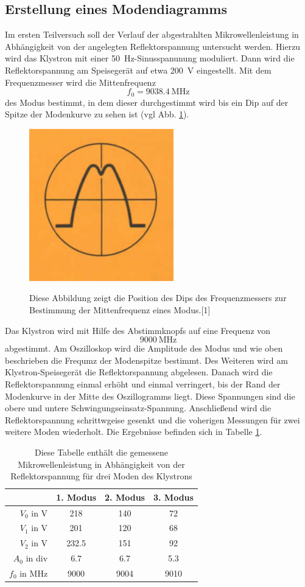 \documentclass[a4paper]{article}
\begin{document}
\subsection{Erstellung eines Modendiagramms}
Im ersten Teilversuch soll der Verlauf der abgestrahlten Mikrowellenleistung in Abhängigkeit von der angelegten Reflektorspannung untersucht werden.
Hierzu wird das Klystron mit einer \SI{50}{\hertz}-Sinusspanunung moduliert.
Dann wird die Reflektorspannung am Speisegerät auf etwa \SI{200}{\volt} eingestellt.
Mit dem Frequenzmesser wird die Mittenfrequenz 
\[
f_0 = \SI{9038,4}{\mega\hertz}
\]
des Modus bestimmt, in dem dieser durchgestimmt wird bis ein Dip auf der Spitze der Modenkurve zu sehen ist (vgl Abb. \ref{dip}).
\begin{figure}[h]
\centering
\includegraphics[scale=0.7]{mode_dip.png}
\label{dip}
\caption{Diese Abbildung zeigt die Position des Dips des Frequenzmessers zur Bestimmung der Mittenfrequenz eines Modus.[1]}
\end{figure}
Das Klystron wird mit Hilfe des Abstimmknopfs auf eine Frequenz von
\[
\SI{9000}{\mega\hertz} 
\]
abgestimmt. Am Oszilloskop wird die Amplitude des Modus und wie oben beschrieben die Frequmz der Modenspitze bestimmt.
Des Weiteren wird am Klystron-Speisegerät die Reflektorspannung abgelesen. Danach wird die Reflektorspannung einmal erhöht und einmal verringert, 
bis der Rand der Modenkurve in der Mitte des Oszillogramms liegt. 
Diese Spannungen sind die obere und untere Schwingungseinsatz-Spannung.
Anschließend wird die Reflektorspannung schrittwgeise gesenkt und die voherigen Messungen für zwei weitere Moden wiederholt.
Die Ergebnisse befinden sich in Tabelle \ref{modedata}.
\begin{table}[h]
\centering
\begin{tabular}{rccc}
\toprule
& 1. Modus & 2. Modus & 3. Modus \\
\midrule
$V_0$ in \si{\volt}  & 218 & 140 & 72 \\
$V_1$ in \si{\volt} & 201 & 120 & 68 \\
$V_2$ in \si{\volt} &232.5 & 151 & 92 \\
$A_0$ in div & 6.7 & 6.7 & 5.3 \\
$f_0$ in \si{\mega\hertz} & 9000 & 9004 & 9010 \\
\bottomrule
\end{tabular}
\label{modedata}
\caption{Diese Tabelle enthält die gemessene Mikrowellenleistung in Abhängigkeit von der Reflektorspannung für drei Moden des Klystrons}
\end{table}
\end{document}
